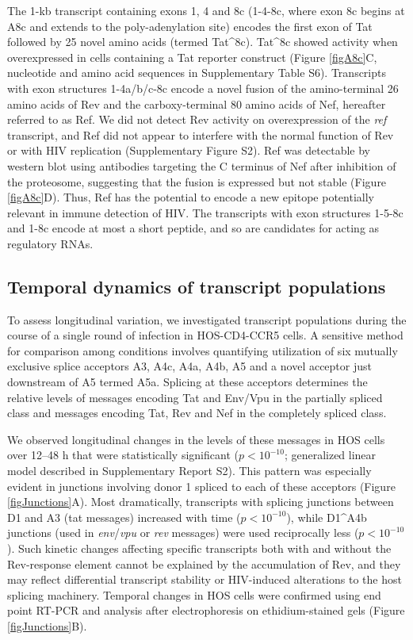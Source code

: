 \documentclass[../sherrill-Mix_thesis.tex]{subfiles}
\begin{document}
The 1-kb transcript containing exons 1, 4 and 8c (1-4-8c, where exon 8c begins at A8c and extends to the poly-adenylation site) encodes the first exon of Tat followed by 25 novel amino acids (termed Tat\^{}8c). Tat\^{}8c showed activity when overexpressed in cells containing a Tat reporter construct (Figure \ref{figA8c}C, nucleotide and amino acid sequences in Supplementary Table S6). Transcripts with exon structures 1-4a/b/c-8c encode a novel fusion of the amino-terminal 26 amino acids of Rev and the carboxy-terminal 80 amino acids of Nef, hereafter referred to as Ref. We did not detect Rev activity on overexpression of the \textit{ref} transcript, and Ref did not appear to interfere with the normal function of Rev or with HIV replication (Supplementary Figure S2). Ref was detectable by western blot using antibodies targeting the C terminus of Nef after inhibition of the proteosome, suggesting that the fusion is expressed but not stable (Figure \ref{figA8c}D). Thus, Ref has the potential to encode a new epitope potentially relevant in immune detection of HIV. The transcripts with exon structures 1-5-8c and 1-8c encode at most a short peptide, and so are candidates for acting as regulatory RNAs.

\subsection{Temporal dynamics of transcript populations}
To assess longitudinal variation, we investigated \hivEight{} transcript populations during the course of a single round of infection in HOS-CD4-CCR5 cells. A sensitive method for comparison among conditions involves quantifying utilization of six mutually exclusive splice acceptors A3, A4c, A4a, A4b, A5 and a novel acceptor just downstream of A5 termed A5a. Splicing at these acceptors determines the relative levels of messages encoding Tat and Env/Vpu in the partially spliced class and messages encoding Tat, Rev and Nef in the completely spliced class.

We observed longitudinal changes in the levels of these messages in HOS cells over 12--48 h that were statistically significant ($p < 10^{-10}$; generalized linear model described in Supplementary Report S2). This pattern was especially evident in junctions involving donor 1 spliced to each of these acceptors (Figure \ref{figJunctions}A). Most dramatically, transcripts with splicing junctions between D1 and A3 (tat messages) increased with time ($p < 10^{-10}$), while D1\^{}A4b junctions (used in \textit{env}/\textit{vpu} or \textit{rev} messages) were used reciprocally less ($p < 10^{-10}$). Such kinetic changes affecting specific transcripts both with and without the Rev-response element cannot be explained by the accumulation of Rev, and they may reflect differential transcript stability or HIV-induced alterations to the host splicing machinery. Temporal changes in HOS cells were confirmed using end point RT-PCR and analysis after electrophoresis on ethidium-stained gels (Figure \ref{figJunctions}B). 
\end{document}
